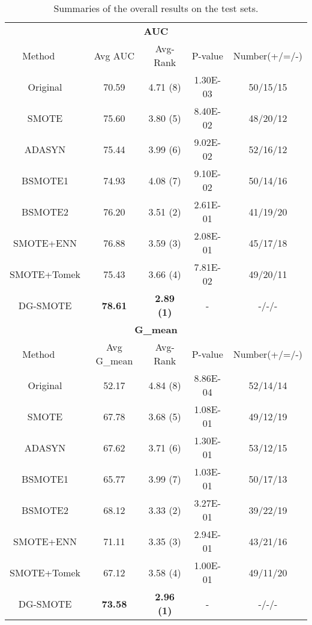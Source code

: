 \documentclass[journal]{IEEEtran}
\begin{document}
\begin{table}[htbp]
	\begin{threeparttable}
		\caption{Summaries of the overall results on the test sets.}
		\renewcommand\arraystretch{1.4}
		\scriptsize
		
		\begin{tabular}{|c|c|c|c|c|}  
			\hline
			\multicolumn{5}{|c|}{\textbf{AUC}}
			\\\cline{1-5}
			Method ~~& Avg AUC  &Avg-Rank &P-value &Number(+/=/-) \\   \hline 
			Original &70.59 &4.71 (8) &1.30E-03 &50/15/15\\ \hline
			SMOTE &75.60 &3.80 (5) &8.40E-02 &48/20/12\\ \hline
			ADASYN &75.44 &3.99 (6) &9.02E-02 &52/16/12\\ \hline
			BSMOTE1 &74.93 &4.08 (7) &9.10E-02 &50/14/16\\  \hline
			BSMOTE2 &76.20 &3.51 (2) &2.61E-01  &41/19/20\\ \hline	
			SMOTE+ENN &76.88 &3.59 (3) &2.08E-01  &45/17/18\\ \hline	
			SMOTE+Tomek &75.43  &3.66 (4)  &7.81E-02 &49/20/11\\ \hline
			DG-SMOTE &\textbf{78.61} &\textbf{2.89 (1)} &-&-/-/-\\  \hline  
			
			\multicolumn{5}{|c|}{\textbf{G\_mean}}
			\\\cline{1-5}
			Method ~~& Avg G\_mean  &Avg-Rank &P-value &Number(+/=/-) \\   \hline 
			Original &52.17 &4.84 (8) &8.86E-04 &52/14/14\\ \hline
			SMOTE &67.78 &3.68 (5)  &1.08E-01 &49/12/19\\ \hline
			ADASYN &67.62 &3.71 (6) &1.30E-01 &53/12/15\\ \hline
			BSMOTE1 &65.77 &3.99 (7) &1.03E-01 &50/17/13\\  \hline
			BSMOTE2 &68.12 &3.33 (2) &3.27E-01 &39/22/19\\ \hline	
			SMOTE+ENN &71.11 &3.35 (3) &2.94E-01 &43/21/16\\ \hline	
			SMOTE+Tomek &67.12  &3.58 (4)  &1.00E-01 &49/11/20\\ \hline
			DG-SMOTE &\textbf{73.58} &\textbf{2.96 (1)} &-&-/-/-\\  \hline  
		\end{tabular}
		\label{performance_summaries-all}
	\end{threeparttable}
\end{table} 
\end{document}
